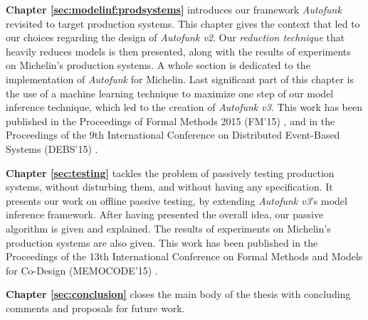 \textbf{Chapter \ref{sec:modelinf:prodsystems}} introduces our
framework \textit{Autofunk} revisited to target production
systems. This chapter gives the context that led to our choices
regarding the design of \textit{Autofunk v2}. Our \emph{reduction
technique} that heavily reduces models is then presented, along
with the results of experiments on Michelin's production systems.
A whole section is dedicated to the implementation of
\textit{Autofunk} for Michelin. Last significant part of this
chapter is the use of a machine learning technique to maximize
one step of our model inference technique, which led to the
creation of \emph{Autofunk v3}. This work has been published in
the Proceedings of Formal Methods 2015 (FM'15)
\cite{DBLP:conf/fm/DurandS15}, and in the Proceedings of the 9th
International Conference on Distributed Event-Based Systems
(DEBS'15) \cite{DBLP:conf/debs/SalvaD15}.

\textbf{Chapter \ref{sec:testing}} tackles the problem of
passively testing production systems, without disturbing them,
and without having any specification. It presents our work on
offline passive testing, by extending \textit{Autofunk v3}'s
model inference framework. After having presented the overall
idea, our passive algorithm is given and explained. The results
of experiments on Michelin's production systems are also given.
This work has been published in the Proceedings of the 13th
International Conference on Formal Methods and Models for
Co-Design (MEMOCODE'15) \cite{7340480}.

\textbf{Chapter \ref{sec:conclusion}} closes the main body of the
thesis with concluding comments and proposals for future work.

\cleardoublepage
\blankpage
